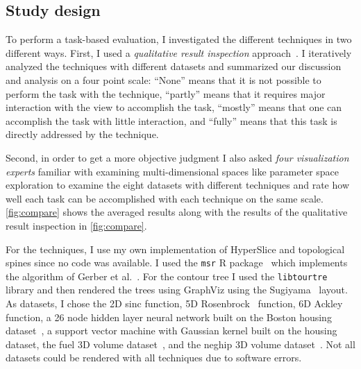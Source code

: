 
\subsection{Study design}

To perform a task-based evaluation, I investigated the different techniques in two different ways.
First, I used a \textit{qualitative result inspection}
approach~\cite{Isenberg:2013}. 
I iteratively analyzed the techniques with different datasets and summarized
our discussion and analysis on a four point scale:
``None'' means that it is not possible to perform the task with the technique,
``partly'' means that it requires major interaction with the view to accomplish
the task, ``mostly'' means that one can accomplish the task with little
interaction, and ``fully'' means that this task is directly addressed by the
technique. 

Second, in order to get a more objective judgment I also asked 
\textit{four visualization experts} familiar with examining multi-dimensional spaces like
parameter space exploration to examine the eight datasets with different
techniques and rate how well each task can be accomplished with each technique
on the same scale. \autoref{fig:compare} shows the averaged results along with the
results of the qualitative result inspection in \autoref{fig:compare}.

For the techniques, I use my own implementation of HyperSlice and topological
spines since no code was available. I used the \texttt{msr} R
package~\cite{Gerber:2012} which implements the algorithm of Gerber et
al.~\cite{Gerber:2010}. For the contour tree I used the \texttt{libtourtre}
library and then rendered the trees using GraphViz using the
Sugiyama~\cite{Gansner:1993} layout.  As datasets, I chose the 2D sinc
function, 5D Rosenbrock~\cite{Rosenbrock:1960} function, 6D Ackley function, a
26 node hidden layer neural network built on the Boston housing
dataset~\cite{Lichman:2013}, a support vector machine with Gaussian kernel
built on the housing dataset, the fuel 3D volume dataset~\cite{Roettger:2017},
and the neghip 3D volume dataset~\cite{Roettger:2017}.  
Not all datasets could be rendered with all techniques due to software errors.

